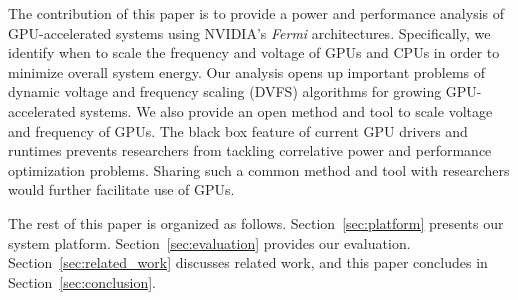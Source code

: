 The contribution of this paper is to provide a power and performance
analysis of GPU-accelerated systems using NVIDIA's \textit{Fermi}
architectures.
Specifically, we identify when to scale the frequency and voltage of
GPUs and CPUs in order to minimize overall system energy.
Our analysis opens up important problems of dynamic voltage and
frequency scaling (DVFS) algorithms for growing GPU-accelerated
systems.
We also provide an open method and tool to scale voltage and frequency
of GPUs.
The black box feature of current GPU drivers and runtimes prevents
researchers from tackling correlative power and performance optimization
problems.
Sharing such a common method and tool with researchers
would further facilitate use of GPUs.

The rest of this paper is organized as follows.
Section~\ref{sec:platform} presents our system platform.
Section~\ref{sec:evaluation} provides our evaluation.
Section~\ref{sec:related_work} discusses related work, and this paper
concludes in Section~\ref{sec:conclusion}.

